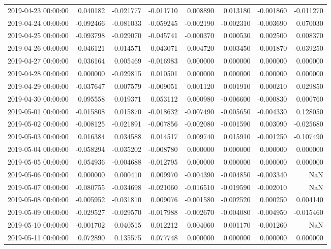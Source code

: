 \begin{tabular}{lrrrrrrr}
2019-04-23 00:00:00 & 0.040182 & -0.021777 & -0.011710 & 0.008890 & 0.013180 & -0.001860 & -0.011270 \\
2019-04-24 00:00:00 & -0.092466 & -0.081033 & -0.059245 & -0.002190 & -0.002310 & -0.003690 & 0.070030 \\
2019-04-25 00:00:00 & -0.093798 & -0.029070 & -0.045741 & -0.000370 & 0.000530 & 0.002500 & 0.008370 \\
2019-04-26 00:00:00 & 0.046121 & -0.014571 & 0.043071 & 0.004720 & 0.003450 & -0.001870 & -0.039250 \\
2019-04-27 00:00:00 & 0.036164 & 0.005469 & -0.016983 & 0.000000 & 0.000000 & 0.000000 & 0.000000 \\
2019-04-28 00:00:00 & 0.000000 & -0.029815 & 0.010501 & 0.000000 & 0.000000 & 0.000000 & 0.000000 \\
2019-04-29 00:00:00 & -0.037647 & 0.007579 & -0.009051 & 0.001120 & 0.001910 & 0.000210 & 0.029850 \\
2019-04-30 00:00:00 & 0.095558 & 0.019371 & 0.053112 & 0.000980 & -0.006600 & -0.000830 & 0.000760 \\
2019-05-01 00:00:00 & -0.015808 & 0.015870 & -0.018632 & -0.007490 & -0.005650 & -0.004330 & 0.128050 \\
2019-05-02 00:00:00 & -0.008125 & -0.021891 & -0.007856 & -0.002080 & -0.001590 & 0.003090 & -0.025680 \\
2019-05-03 00:00:00 & 0.016384 & 0.034588 & 0.014517 & 0.009740 & 0.015910 & -0.001250 & -0.107490 \\
2019-05-04 00:00:00 & -0.058294 & -0.035202 & -0.008780 & 0.000000 & 0.000000 & 0.000000 & 0.000000 \\
2019-05-05 00:00:00 & 0.054936 & -0.004688 & -0.012795 & 0.000000 & 0.000000 & 0.000000 & 0.000000 \\
2019-05-06 00:00:00 & 0.000000 & 0.000410 & 0.009970 & -0.004390 & -0.004850 & -0.003340 & NaN \\
2019-05-07 00:00:00 & -0.080755 & -0.034698 & -0.021060 & -0.016510 & -0.019590 & -0.002010 & NaN \\
2019-05-08 00:00:00 & -0.005952 & -0.031810 & 0.009076 & -0.001580 & -0.002520 & 0.000250 & 0.004140 \\
2019-05-09 00:00:00 & -0.029527 & -0.029570 & -0.017988 & -0.002670 & -0.004080 & -0.004950 & -0.015460 \\
2019-05-10 00:00:00 & -0.001702 & 0.040515 & 0.012212 & 0.004060 & 0.001170 & -0.001260 & NaN \\
2019-05-11 00:00:00 & 0.072890 & 0.135575 & 0.077748 & 0.000000 & 0.000000 & 0.000000 & 0.000000 \\

\end{tabular}
